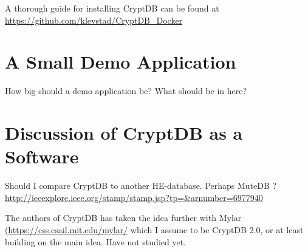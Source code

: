 A thorough guide for installing CryptDB can be found at \url{https://github.com/klevstad/CryptDB_Docker}

\section{A Small Demo Application}

How big should a demo application be? What should be in here?


\section{Discussion of CryptDB as a Software}

Should I compare CryptDB to another HE-database. Perhaps MuteDB ? \url{http://ieeexplore.ieee.org/stamp/stamp.jsp?tp=&arnumber=6977940}




The authors of CryptDB has taken the idea further with Mylar (\url{https://css.csail.mit.edu/mylar/} which I assume to be CryptDB 2.0, or at least building on the main idea. Have not studied yet.
